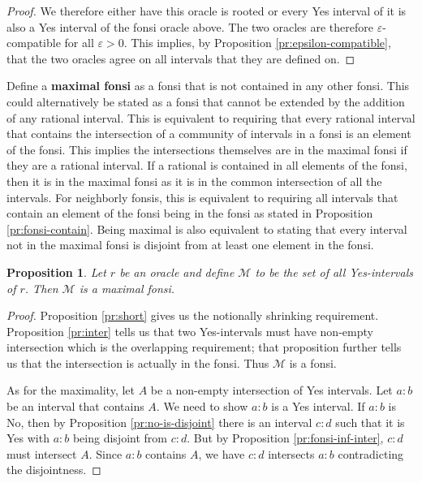 \documentclass[12pt]{article}
\newtheorem{proposition}{Proposition}[subsection]
\begin{document}
\begin{proof}
We therefore either have this oracle is rooted or every Yes interval of it is also a Yes interval of the fonsi oracle above. The two oracles are therefore $\varepsilon$-compatible for all $\varepsilon > 0$. This implies, by Proposition \ref{pr:epsilon-compatible}, that the two oracles agree on all intervals that they are defined on.

\end{proof}

Define a \textbf{maximal fonsi} as a fonsi that is not contained in any other fonsi. This could alternatively be stated as a fonsi that cannot be extended by the addition of any rational interval. This is equivalent to requiring that every rational interval that contains the intersection of a community of intervals in a fonsi is an element of the fonsi. This implies the intersections themselves are in the maximal fonsi if they are a rational interval. If a rational is contained in  all elements of the fonsi, then it is in the maximal fonsi as it is in the common intersection of all the intervals. For neighborly fonsis, this is equivalent to requiring all intervals that contain an element of the fonsi being in the fonsi as stated in Proposition \ref{pr:fonsi-contain}. Being maximal is also equivalent to stating that every interval not in the maximal fonsi is disjoint from at least one element in the fonsi. 

\begin{proposition} Let $r$ be an oracle and define $\mathcal{M}$ to be the set of all Yes-intervals of $r$. Then $\mathcal{M}$ is a maximal fonsi. 
\end{proposition}

\begin{proof}
     Proposition \ref{pr:short} gives us the notionally shrinking requirement. Proposition \ref{pr:inter} tells us that two Yes-intervals must have non-empty intersection which is the overlapping requirement; that proposition further tells us that the intersection is actually in the fonsi. Thus $\mathcal{M}$ is a fonsi. 

     As for the maximality, let $A$ be a non-empty intersection of Yes intervals. Let $a:b$ be an interval that contains $A$. We need to show $a:b$ is a Yes interval. If $a:b$ is No, then by Proposition \ref{pr:no-is-disjoint} there is an interval $c:d$ such that it is Yes with $a:b$ being disjoint from $c:d$. But by Proposition \ref{pr:fonsi-inf-inter}, $c:d$ must intersect $A$. Since $a:b$ contains $A$, we have $c:d$ intersects $a:b$ contradicting the disjointness. 
\end{proof}
\end{document}
